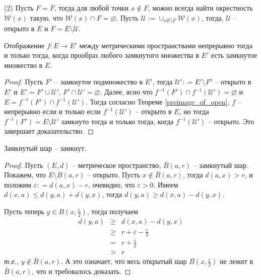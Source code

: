 (2) Пусть $F = \overline{F}$, тогда для любой точки $x \notin F$, можно всегда найти окрестность $\mathscr{W}(x)$ такую, что $\mathscr{W}(x) \cap F = \varnothing$. Пусть $\mathscr{U}:= \cup_{x E\setminus F} \mathscr{W}(x)$, тогда, $\mathscr{U}$ -- открыто в $E$ и $F = E \setminus \mathscr{U}.$


\begin{lemma}\label{preimage_of_closed}
    Отображение $f:E \to E'$ между метрическими пространствами непрерывно тогда и только тогда, когда прообраз любого замкнутого множества в $E'$ есть замкнутое множество в $E.$
\end{lemma}

\begin{proof}
    Пусть $F'$ -- замкнутое подмножество в $E'$, тогда $\mathscr{U}': = E'\setminus F'$ -- открыто в $E'$ и $E' = F' \cup \mathscr{U}'$, $F' \cap \mathscr{U}' = \varnothing$. Далее, ясно что $f^{-1}(F') \cap f^{-1}(\mathscr{U}') = \varnothing$ и $E = f^{-1}(F') \cap f^{-1}(\mathscr{U}')$. Тогда согласно Теореме \ref{preimage_of_open}, $f$ -- непрерывно если и только если $f^{-1}(\mathscr{U}')$ -- открыто в $E$, но тогда $f^{-1}(F') = E \setminus \mathscr{U}'$ замкнуто тогда и только тогда, когда $f^{-1}(\mathscr{U}')$ -- открыто. Это завершает доказательство.
\end{proof}

\begin{lemma}\label{closed_ball=closed}
    Замкнутый шар -- замкнут.
\end{lemma}
\begin{proof}
Пусть $(E,d)$ -- метрическое пространство, $\bar B(a,r)$ -- замкнутый шар. Покажем, что $E\setminus B(a,r)$ -- открыто. Пусть $x\notin \bar B(a,r)$, тогда $d(a,x) > r$, и положим $\varepsilon: = d(a,x) - r$, очевидно, что $\varepsilon >0$. Имеем $d(x,a) \le d(y,a) + d(y,x)$, тогда $d(y,a) \ge d(x,a) - d(y,x)$.

Пусть теперь $y\in B(x, \frac{\varepsilon}{2})$, тогда получаем
\begin{eqnarray*}
    d(y,a) &\ge & d(x,a) - d(y,x) \\
    &\ge & r + \varepsilon- \frac{\varepsilon}{2}\\
    &=& r + \frac{\varepsilon}{2}\\
    &>& r
\end{eqnarray*}
\textit{т.е.,} $y\notin \bar B(a,r)$. А это означает, что весь открытый шар $B(x, \frac{\varepsilon}{2})$ не лежит в $\bar B(a,r)$, что и требовалось доказать.
\end{proof}



